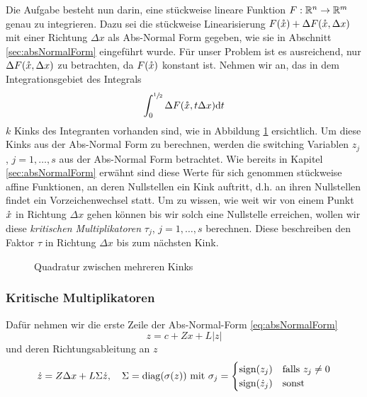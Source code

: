 Die Aufgabe besteht nun darin, eine stückweise lineare Funktion $F:\mathbb{R}^n \to \mathbb{R}^m$ genau zu integrieren. Dazu sei die stückweise Linearisierung $F(\mathring{x}) + \Delta F(\mathring{x},\Delta x)$ mit einer Richtung $\Delta x$ als Abs-Normal Form gegeben, wie sie in Abschnitt \ref{sec:absNormalForm} eingeführt wurde. 
Für unser Problem ist es ausreichend, nur $\Delta F(\mathring{x},\Delta x)$ zu betrachten, da $F(\mathring{x})$ konstant ist.
Nehmen wir an, das in dem Integrationsgebiet des Integrals
\begin{equation}
\label{eq:quadInitialProblem}
 \int_0^{\sfrac{1}{2}} \Delta F(\mathring{x},t\Delta x) \text{d}t
\end{equation}
$k$ Kinks des Integranten vorhanden sind, wie in Abbildung \ref{fig:quadrature} ersichtlich. 
Um diese Kinks aus der Abs-Normal Form zu berechnen, werden die switching Variablen $z_j$, $j=1,\ldots,s$ aus der Abs-Normal Form betrachtet. Wie bereits in Kapitel \ref{sec:absNormalForm} erwähnt sind diese Werte für sich genommen stückweise affine Funktionen, an deren Nullstellen ein Kink auftritt,
d.h. an ihren Nullstellen findet ein Vorzeichenwechsel statt. Um zu wissen, wie weit wir von einem Punkt $\mathring{x}$ in Richtung $\Delta x$ gehen können bis wir solch eine Nullstelle erreichen, wollen wir diese \textit{kritischen Multiplikatoren} $\tau_j$, $j=1,\ldots, s$ berechnen. Diese beschreiben den Faktor $\tau$ in Richtung $\Delta x$ bis zum nächsten Kink. 
\begin{figure}[ht]
\centering
 
 \caption{Quadratur zwischen mehreren Kinks}
\label{fig:quadrature} 
\end{figure}
\subsubsection{Kritische Multiplikatoren}
Dafür nehmen wir die erste Zeile der Abs-Normal-Form \eqref{eq:absNormalForm}
\begin{equation}
\label{eq:absNormalZ}
 z = c+Zx + L|z|
\end{equation}
und deren Richtungsableitung an $z$
\begin{equation}
\label{eq:absNormalZDerivative}
 \dot z = Z\Delta x + L\Sigma \dot z, \quad
 \Sigma  = \operatorname{diag}(\sigma(z)) ~ \text{mit } \sigma_j =  \begin{cases}
            \text{sign}(z_j) & \text{falls } z_j\neq 0\\
            \text{sign}(\dot z_j) &  \text{sonst}
           \end{cases}
\end{equation}

